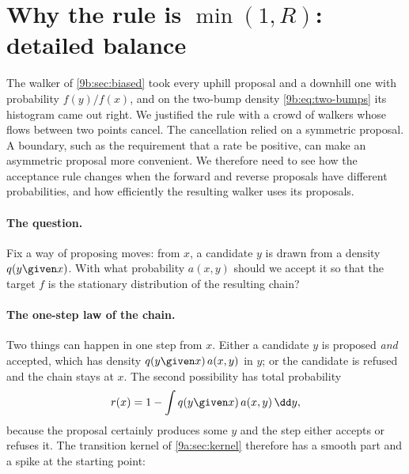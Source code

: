 \section{Why the rule is \texorpdfstring{$\min(1,R)$}{min(1,R)}: detailed balance}
\label{9b:sec:balance}

The walker of \cref{9b:sec:biased} took every uphill proposal and a downhill one with
probability $f(y)/f(x)$, and on the two-bump density \eqref{9b:eq:two-bumps} its histogram came
out right. We justified the rule with a crowd of walkers whose flows between two points cancel.
The cancellation relied on a symmetric proposal. A boundary, such as the
requirement that a rate be positive, can make an asymmetric proposal more
convenient. We therefore need to see how the acceptance rule changes when
the forward and reverse proposals have different probabilities, and how
efficiently the resulting walker uses its proposals.

\paragraph{The question.} Fix a way of proposing moves: from $x$, a candidate $y$ is drawn from
a density $q(y\given x)$. With what probability $a(x,y)$ should we accept it so that the target
$f$ is the stationary distribution of the resulting chain?

\paragraph{The one-step law of the chain.}
Two things can happen in one step from $x$. Either a candidate $y$ is proposed \emph{and}
accepted, which has density $q(y\given x)\,a(x,y)$ in $y$; or the candidate is refused and the
chain stays at $x$. The second possibility has total probability
\begin{equation}
  r(x)=1-\int q(y\given x)\,a(x,y)\,\dd y ,
  \label{9b:eq:reject-mass}
\end{equation}
because the proposal certainly produces some $y$ and the step either accepts or refuses it.
The transition kernel of \cref{9a:sec:kernel} therefore has a smooth part and a spike at the
starting point:

